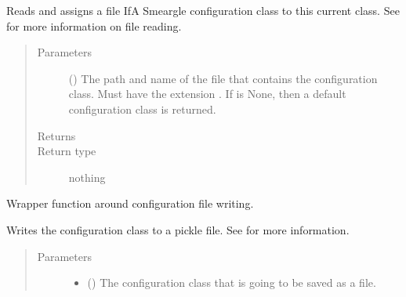 \documentclass[letterpaper,10pt,english]{sphinxmanual}
\begin{document}
\begin{fulllineitems}
\begin{fulllineitems}
Reads and assigns a file IfA Smeargle configuration class to this
current class. See  for more information on
file reading.
\begin{quote}\begin{description}
\item[{Parameters}] \leavevmode
{} () \textendash{} The path and name of the file that contains the configuration
class. Must have the extension . If 
is None, then a default configuration class is returned.

\item[{Returns}] \leavevmode


\item[{Return type}] \leavevmode
nothing

\end{description}\end{quote}

\end{fulllineitems}


\begin{fulllineitems}
\label{\detokenize{python_docstrings/IfA_Smeargle.yankee.configuration_classes.BaseConfig_file:IfA_Smeargle.yankee.configuration_classes.BaseConfig_file.BaseConfig.write_to_file}}
Wrapper function around configuration file writing.

Writes the configuration class to a pickle file. See
 for more information.
\begin{quote}\begin{description}
\item[{Parameters}] \leavevmode\begin{itemize}
\item {} 
 () \textendash{} The configuration class that is going to be saved as a file.


\end{itemize}
\end{description}
\end{quote}
\end{fulllineitems}
\end{fulllineitems}
\end{document}
